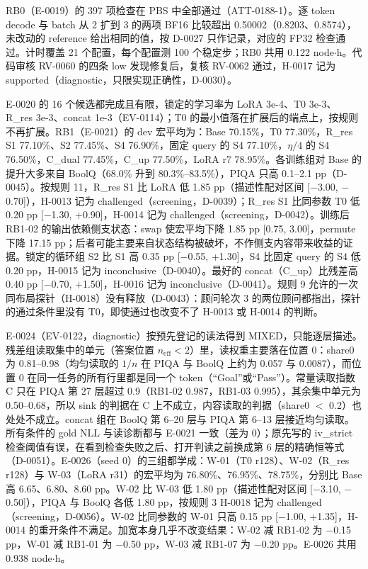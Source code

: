 \documentclass[11pt]{article}
\begin{document}
RB0（E-0019）的 397 项检查在 PBS 中全部通过（ATT-0188-1）。逐 token decode 与 batch 从 2 扩到 3 的两项 BF16 比较超出 0.50002（0.8203、0.8574），未改动的 reference 给出相同的值，按 D-0027 只作记录，对应的 FP32 检查通过。计时覆盖 21 个配置，每个配置测 100 个稳定步；RB0 共用 0.122 node$\cdot$h。代码审核 RV-0060 的四条 low 发现修复后，复核 RV-0062 通过，H-0017 记为 supported（diagnostic，只限实现正确性，D-0030）。

E-0020 的 16 个候选都完成且有限，锁定的学习率为 LoRA 3e-4、T0 3e-3、R\_res 3e-3、concat 1e-3（EV-0114）；T0 的最小值落在扩展后的端点上，按规则不再扩展。RB1（E-0021）的 dev 宏平均为：Base 70.15\%，T0 77.30\%，R\_res S1 77.10\%、S2 77.45\%、S4 76.90\%，固定 query 的 S4 77.10\%，$\eta/4$ 的 S4 76.50\%，C\_dual 77.45\%，C\_up 77.50\%，LoRA r7 78.95\%。各训练组对 Base 的提升大多来自 BoolQ（68.0\% 升到 80.3\%--83.5\%），PIQA 只高 0.1--2.1 pp（D-0045）。按规则 11，R\_res S1 比 LoRA 低 1.85 pp（描述性配对区间 [$-$3.00, $-$0.70]），H-0013 记为 challenged（screening，D-0039）；R\_res S1 比同参数 T0 低 0.20 pp [$-$1.30, +0.90]，H-0014 记为 challenged（screening，D-0042）。训练后 RB1-02 的输出依赖侧支状态：swap 使宏平均下降 1.85 pp [0.75, 3.00]，permute 下降 17.15 pp；后者可能主要来自状态结构被破坏，不作侧支内容带来收益的证据。锁定的循环组 S2 比 S1 高 0.35 pp [$-$0.55, +1.30]，S4 比固定 query 的 S4 低 0.20 pp，H-0015 记为 inconclusive（D-0040）。最好的 concat（C\_up）比残差高 0.40 pp [$-$0.70, +1.50]，H-0016 记为 inconclusive（D-0041）。规则 9 允许的一次同布局探针（H-0018）没有释放（D-0043）：顾问轮次 3 的两位顾问都指出，探针的通过条件里没有 T0，即使通过也改变不了 H-0013 或 H-0014 的判断。

E-0024（EV-0122，diagnostic）按预先登记的读法得到 MIXED，只能逐层描述。残差组读取集中的单元（答案位置 $n_\text{eff}<2$）里，读权重主要落在位置 0：share0 为 0.81--0.98（均匀读取的 $1/n$ 在 PIQA 与 BoolQ 上约为 0.057 与 0.0087），而位置 0 在同一任务的所有行里都是同一个 token（``Goal''或``Pass''）。常量读取指数 C 只在 PIQA 第 27 层超过 0.9（RB1-02 0.987，RB1-03 0.995），其余集中单元为 0.50--0.68，所以 sink 的判据在 C 上不成立，内容读取的判据（share0 $<$ 0.2）也处处不成立。concat 组在 BoolQ 第 6--20 层与 PIQA 第 6--13 层接近均匀读取。所有条件的 gold NLL 与读诊断都与 E-0021 一致（差为 0）；原先写的 iv\_strict 检查阈值有误，在看到检查失败之后、打开判读之前换成第 6 层的精确恒等式（D-0051）。E-0026（seed 0）的三组都学成：W-01（T0 r128）、W-02（R\_res r128）与 W-03（LoRA r31）的宏平均为 76.80\%、76.95\%、78.75\%，分别比 Base 高 6.65、6.80、8.60 pp。W-02 比 W-03 低 1.80 pp（描述性配对区间 [$-$3.10, $-$0.50]），PIQA 与 BoolQ 各低 1.80 pp，按规则 3 H-0018 记为 challenged（screening，D-0056）。W-02 比同参数的 W-01 只高 0.15 pp [$-$1.00, +1.35]，H-0014 的重开条件不满足。加宽本身几乎不改变结果：W-02 减 RB1-02 为 $-$0.15 pp，W-01 减 RB1-01 为 $-$0.50 pp，W-03 减 RB1-07 为 $-$0.20 pp。E-0026 共用 0.938 node$\cdot$h。
\end{document}
